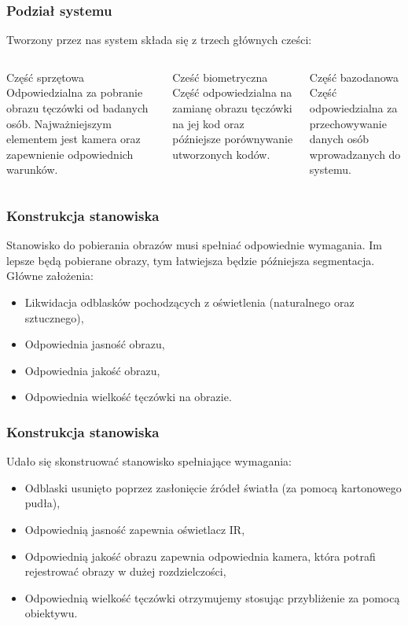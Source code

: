 \documentclass{beamer}
\begin{document}

\begin{frame}
\frametitle{Podział systemu}

Tworzony przez nas system składa się z trzech głównych cześci:
\begin{columns}[t]
\begin{block}{Część sprzętowa}
Odpowiedzialna za pobranie obrazu tęczówki od badanych osób. Najważniejszym elementem jest kamera oraz zapewnienie odpowiednich warunków.
\end{block}
\begin{block}{Cześć biometryczna}
Część odpowiedzialna na zamianę obrazu tęczówki na jej kod oraz późniejsze porównywanie utworzonych kodów.
\end{block}
\begin{block}{Część bazodanowa}
Część odpowiedzialna za przechowywanie danych osób wprowadzanych do systemu.
\end{block}
\end{columns} 

\end{frame}


\begin{frame}
\frametitle{Konstrukcja stanowiska}
Stanowisko do pobierania obrazów musi spełniać odpowiednie wymagania. Im lepsze będą pobierane obrazy, tym łatwiejsza będzie późniejsza segmentacja. Główne założenia:
\begin{itemize}
\item Likwidacja odblasków pochodzących z oświetlenia (naturalnego oraz sztucznego),
\item Odpowiednia jasność obrazu,
\item Odpowiednia jakość obrazu,
\item Odpowiednia wielkość tęczówki na obrazie.
\end{itemize}
\end{frame}

\begin{frame}
\frametitle{Konstrukcja stanowiska}
Udało się skonstruować stanowisko spełniające wymagania:
\begin{itemize}
\item Odblaski usunięto poprzez zasłonięcie źródeł światła (za pomocą kartonowego pudła),
\item Odpowiednią jasność zapewnia oświetlacz IR,
\item Odpowiednią jakość obrazu zapewnia odpowiednia kamera, która potrafi rejestrować obrazy w dużej rozdzielczości,
\item Odpowiednią wielkość tęczówki otrzymujemy stosując przybliżenie za pomocą obiektywu.
\end{itemize}
\end{frame}
\end{document}
